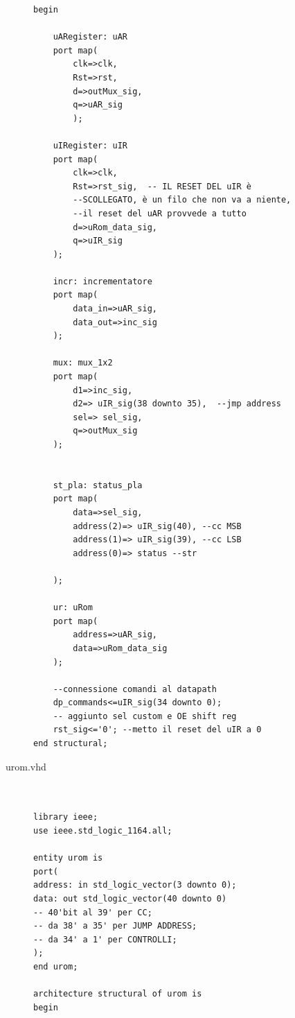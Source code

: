 \documentclass[a4paper, titlepage]{article}
\begin{document}
\begin{description}
\begin{verbatim}
begin

	uARegister: uAR	
	port map(
		clk=>clk,
		Rst=>rst, 
		d=>outMux_sig,
		q=>uAR_sig
		);
		
	uIRegister: uIR
	port map(
		clk=>clk,
		Rst=>rst_sig,  -- IL RESET DEL uIR è
		--SCOLLEGATO, è un filo che non va a niente,
		--il reset del uAR provvede a tutto
		d=>uRom_data_sig,
		q=>uIR_sig
	);
		
	incr: incrementatore
	port map(
		data_in=>uAR_sig,
		data_out=>inc_sig
	);
	
	mux: mux_1x2
	port map(
		d1=>inc_sig,
		d2=> uIR_sig(38 downto 35),  --jmp address
		sel=> sel_sig,
		q=>outMux_sig
	);
		
		
	st_pla: status_pla
	port map(
		data=>sel_sig,
		address(2)=> uIR_sig(40), --cc MSB
		address(1)=> uIR_sig(39), --cc LSB
		address(0)=> status --str
		
	);
	
	ur: uRom 
	port map(
		address=>uAR_sig,
		data=>uRom_data_sig
	);
	
	--connessione comandi al datapath
	dp_commands<=uIR_sig(34 downto 0); 
	-- aggiunto sel custom e OE shift reg
	rst_sig<='0'; --metto il reset del uIR a 0
end structural;

\end{verbatim}
\item [urom.vhd]
\begin{verbatim}


library ieee;
use ieee.std_logic_1164.all; 

entity urom is
port(
address: in std_logic_vector(3 downto 0);
data: out std_logic_vector(40 downto 0) 
-- 40'bit al 39' per CC; 
-- da 38' a 35' per JUMP ADDRESS;
-- da 34' a 1' per CONTROLLI;
);
end urom;

architecture structural of urom is
begin 


\end{verbatim}
\end{description}
\end{document}
